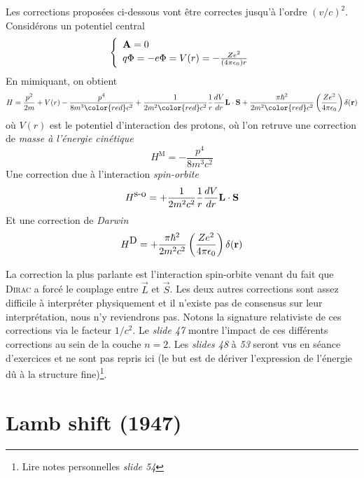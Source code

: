 Les corrections proposées ci-dessous vont être correctes jusqu'à l'ordre $(v/c)^2$. Considérons un
potentiel central
\begin{equation}
\left\{
\begin{array}{l}
{\bf A } = 0 \\
q \Phi = - e \Phi = V(r) = -\frac{Ze^2}{(4 \pi \epsilon_0) r}
\end{array} \right.
\end{equation}
En mimiquant, on obtient
\begin{equation}
H = \frac{p^2}{2m} + V(r)- \frac{p^4}{8 m^3 {\color{red} c^2}} 
+ \frac{1}{2m^2 {\color{red} c^2}} \frac{1}{r}
  \frac{dV}{dr} {\bf L} \cdot {\bf S} 
 + \frac{\pi \hbar^2}{2 m^2 {\color{red} c^2 } }
  \left( \frac{Ze^2}{4 \pi \epsilon_0} \right) \delta( {\bf r} )
\end{equation}
où $V(r)$ est le potentiel d'interaction des protons, où l'on retruve une correction de \textit{masse
à l'énergie cinétique}
\begin{equation}
H^{\mbox{M}} = - \frac{p^4}{8 m^3 c^2}
\end{equation}
Une correction due à l'interaction \textit{spin-orbite}
\begin{equation}
H^{\mbox{s-o}} = + \frac{1}{2m^2 c^2} \frac{1}{r}
  \frac{dV}{dr} {\bf L} \cdot {\bf S} 
\end{equation}
Et une correction de \textit{Darwin}
\begin{equation}
H^{\mbox{D}} = 
 + \frac{\pi \hbar^2}{2 m^2 c^2 } 
  \left( \frac{Ze^2}{4 \pi \epsilon_0} \right) \delta( {\bf r} )
\end{equation}

La correction la plus parlante est l'interaction spin-orbite venant du fait que \textsc{Dirac} a 
forcé le couplage entre $\vec{L}$ et $\vec S$. Les deux autres corrections sont assez difficile à 
interpréter physiquement et il n'existe pas de consensus sur leur interprétation, nous n'y reviendrons
pas. Notons la signature relativiste de ces corrections via le facteur $1/c^2$. Le \textit{slide 47}
montre l'impact de ces différents corrections au sein de la couche $n=2$. Les \textit{slides 48} à
\textit{53} seront vus en séance d'exercices et ne sont pas repris ici (le but est de dériver
l'expression de l'énergie dû à la structure fine)\footnote{Lire notes personnelles \textit{slide 54}}.



\newpage
\section{Lamb shift (1947)}
